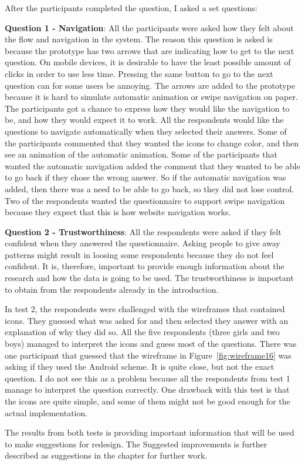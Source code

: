   After the participants completed the question, I asked a set questions:

  {\bf Question 1 - Navigation}: All the participants were asked how they felt about the flow and navigation in the system. The reason this question is asked is because the prototype has two arrows that are indicating how to get to the next question. On mobile devices, it is desirable to have the least possible amount of clicks in order to use less time. Pressing the same button to go to the next question can for some users be annoying. The arrows are added to the prototype because it is hard to simulate automatic animation or swipe navigation on paper. The participants got a chance to express how they would like the navigation to be, and how they would expect it to work. All the respondents would like the questions to navigate automatically when they selected their answers. Some of the participants commented that they wanted the icons to change color, and then see an animation of the automatic animation. Some of the participants that wanted the automatic navigation added the comment that they wanted to be able to go back if they chose the wrong answer. So if the automatic navigation was added, then there was a need to be able to go back, so they did not lose control. Two of the respondents wanted the questionnaire to support swipe navigation because they expect that this is how website navigation works.

  {\bf Question 2 - Trustworthiness}: All the respondents were asked if they felt confident when they answered the questionnaire. Asking people to give away patterns might result in loosing some respondents because they do not feel confident. It is, therefore, important to provide enough information about the research and how the data is going to be used. The trustworthiness is important to obtain from the respondents already in the introduction. 

  In test 2, the respondents were challenged with the wireframes that contained icons. They guessed what was asked for and then selected they answer with an explanation of why they did so. All the five respondents (three girls and two boys) managed to interpret the icons and guess most of the questions. There was one participant that guessed that the wireframe in Figure~\ref{fig:wireframe16} was asking if they used the Android scheme. It is quite close, but not the exact question. I do not see this as a problem because all the respondents from test 1 manage to interpret the question correctly. One drawback with this test is that the icons are quite simple, and some of them might not be good enough for the actual implementation. 

  The results from both tests is providing important information that will be used to make suggestions for redesign. The Suggested improvements is further described as suggestions in the chapter for further work. 

